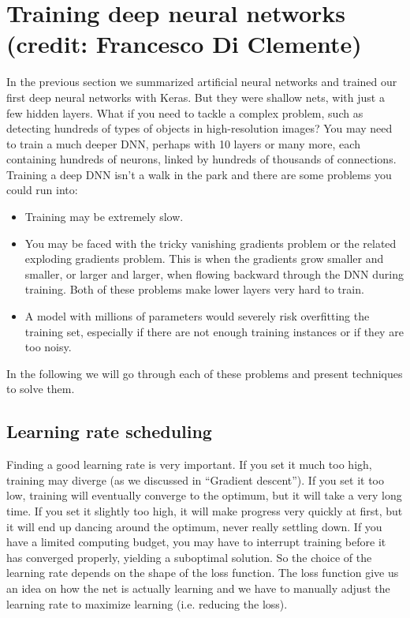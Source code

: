 \section{Training deep neural networks (credit: Francesco Di Clemente)}
In the previous section we summarized artificial neural networks and trained our first deep neural networks with Keras. But they were shallow nets, with just a few hidden layers. What if you need to tackle a complex problem, such as detecting hundreds of types of objects in high-resolution images? You may need to train a much deeper DNN, perhaps with 10 layers or many more, each containing hundreds of neurons, linked by hundreds of thousands of connections. Training a deep DNN isn't a walk in the park and there are some problems you could run into:
\begin{itemize}
\item Training may be extremely slow.
\item You may be faced with the tricky vanishing gradients problem or the related exploding gradients problem. This is when the gradients grow smaller and smaller, or larger and larger, when flowing backward through the DNN during training. Both of these problems make lower layers very hard to train.
\item A model with millions of parameters would severely risk overfitting the training set, especially if there are not enough training instances or if they are too noisy.
\end{itemize}
In the following we will go through each of these problems and present techniques to solve them.
\subsection{Learning rate scheduling}
Finding a good learning rate is very important. If you set it much too high, training may diverge (as we discussed in ``Gradient descent''). If you set it too low, training will eventually converge to the optimum, but it will take a very long time. If you set it slightly too high, it will make progress very quickly at first, but it will end up dancing around the optimum, never really settling down. If you have a limited computing budget, you may have to interrupt training before it has converged properly, yielding a suboptimal solution. So the choice of the learning rate depends on the shape of the loss function. The loss function give us an idea on how the net is actually learning and we have to manually adjust the learning rate to maximize learning (i.e. reducing the loss).

